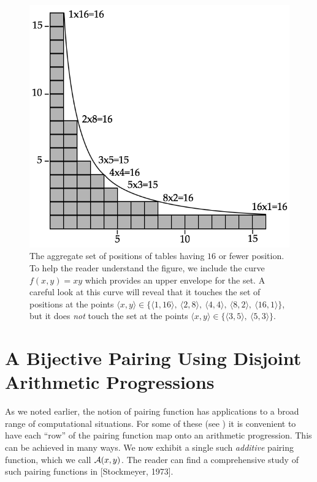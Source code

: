 \begin{figure}[htb]
\begin{center}
       \includegraphics[scale=0.35]{FiguresArithmetic/PairingHyp}
\caption{The aggregate set of positions of tables having $16$ or fewer position.  To help the reader understand the figure, we include the curve $f(x,y) = xy$ which provides an upper envelope for the set.  A careful look at this curve will reveal that it touches the set of positions at the points $\langle x,y \rangle \in \{ \langle 1,16 \rangle, \ \langle 2,8 \rangle, \ \langle 4,4 \rangle, \ \langle 8,2 \rangle, \ \langle 16,1 \rangle \}$, but it does {\em not} touch the set at the points $\langle x,y \rangle \in \{ \langle 3,5 \rangle, \ \langle 5,3 \rangle \}$. 
\label{f.hyp}}
\end{center}
\end{figure}

\section{A Bijective Pairing Using Disjoint Arithmetic Progressions}

As we noted earlier, the notion of pairing function has applications to a broad range of computational situations.  For some of these (see \cite{Rosenberg03}) it is convenient to have each ``row'' of the pairing function map onto an arithmetic progression.  This can be achieved in many ways.  We now exhibit a single such {\em additive} pairing function, which we call $\mbox{$\cal A$}(x,y)$.  The reader can find a comprehensive study of such pairing functions in [Stockmeyer, 1973].

